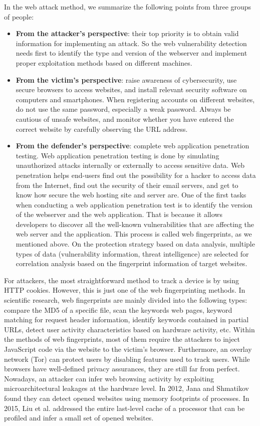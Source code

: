 \documentclass[conference]{IEEEtran}
\begin{document}
In the web attack method, we summarize the following points from three groups of people:
\begin{itemize}
    \item \textbf{From the attacker’s perspective}: their top priority is to obtain valid information for implementing an attack. So the web vulnerability detection needs first to identify the type and version of the webserver and implement proper exploitation methods based on different machines.
    \item \textbf{From the victim’s perspective}: raise awareness of cybersecurity, use secure browsers to access websites, and install relevant security software on computers and smartphones. When registering accounts on different websites, do not use the same password, especially a weak password. Always be cautious of unsafe websites, and monitor whether you have entered the correct website by carefully observing the URL address.
    \item \textbf{From the defender’s perspective}: complete web application penetration testing. Web application penetration testing is done by simulating unauthorized attacks internally or externally to access sensitive data. Web penetration helps end-users find out the possibility for a hacker to access data from the Internet, find out the security of their email servers, and get to know how secure the web hosting site and server are. \cite{b8} One of the first tasks when conducting a web application penetration test is to identify the version of the webserver and the web application. That is because it allows developers to discover all the well-known vulnerabilities that are affecting the web server and the application. This process is called web fingerprints, as we mentioned above. \cite{b9} On the protection strategy based on data analysis, multiple types of data (vulnerability information, threat intelligence) are selected for correlation analysis based on the fingerprint information of target websites.

\end{itemize}

For attackers, the most straightforward method to track a device is by using HTTP cookies. However, this is just one of the web fingerprinting methods. In scientific research, web fingerprints are mainly divided into the following types: compare the MD5 of a specific file, scan the keywords web pages, keyword matching for request header information, identify keywords contained in partial URLs, detect user activity characteristics based on hardware activity, etc. Within the methods of web fingerprints, most of them require the attackers to inject JavaScript code via the website to the victim’s browser. Furthermore, an overlay network (Tor) can protect users by disabling features used to track users. While browsers have well-defined privacy assurances, they are still far from perfect. Nowadays, an attacker can infer web browsing activity by exploiting microarchitectural leakages at the hardware level. \cite{b10} In 2012, Jana and Shmatikov \cite{b11} found they can detect opened websites using memory footprints of processes. In 2015, Liu et al. \cite{b12} addressed the entire last-level cache of a processor that can be profiled and infer a small set of opened websites.
\end{document}
